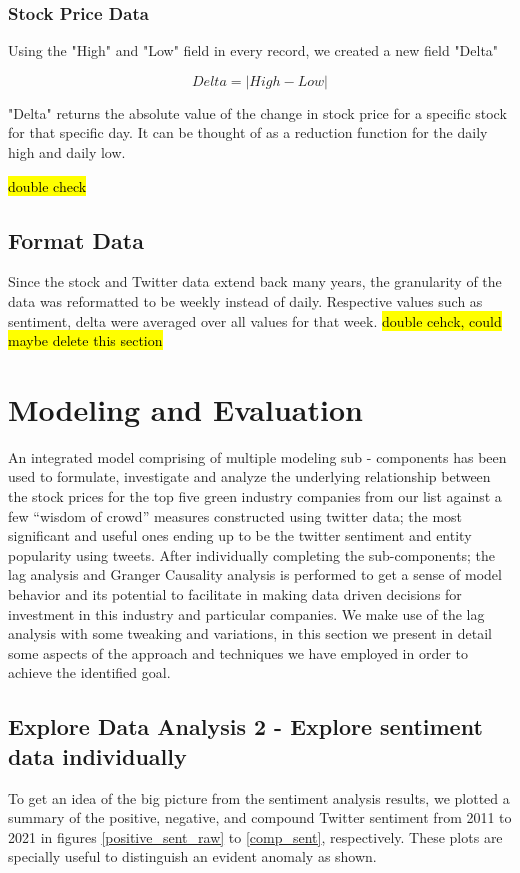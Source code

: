 \documentclass[sigconf, nonacm]{acmart}
\begin{document}
\subsubsection{Stock Price Data}
Using the "High" and "Low" field in every record, we created a new field "Delta"

$$ Delta = |High - Low|$$

"Delta" returns the absolute value of the change in stock price for a specific stock for that specific day. It can be thought of as a reduction function for the daily high and daily low.

\hl{double check}

\subsection{Format Data } 
Since the stock and Twitter data extend back many years, the granularity of the data was reformatted to be weekly instead of daily. Respective values such as sentiment, delta were averaged over all values for that week.
\hl{double cehck, could maybe delete this section}

\section{Modeling and Evaluation}
An integrated model comprising of multiple modeling sub - components has been used to formulate, investigate and analyze the underlying relationship between the stock prices for the top five green industry companies from our list against a few “wisdom of crowd” measures constructed using twitter data; the most significant and useful ones ending up to be the twitter sentiment and entity popularity using tweets. After individually completing the sub-components; the lag analysis and Granger Causality analysis is performed to get a sense of model behavior and its potential to facilitate in making data driven decisions for investment in this industry and particular companies. We make use of the lag analysis with some tweaking and variations, in this section we present in detail some aspects of the approach and techniques we have employed in order to achieve the identified goal.

\subsection{Explore Data Analysis 2 - Explore sentiment data individually} %
To get an idea of the big picture from the sentiment analysis results, we plotted a summary of the positive, negative, and compound Twitter sentiment from 2011 to 2021 in figures \ref{positive_sent_raw} to \ref{comp_sent}, respectively. These plots are specially useful to distinguish an evident anomaly as shown. 
\end{document}
